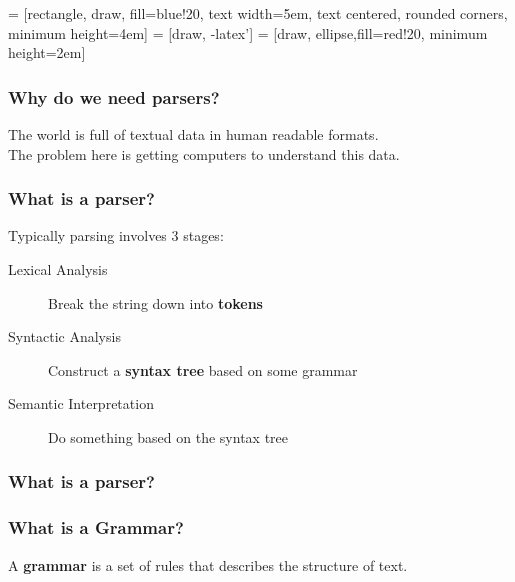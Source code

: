 \documentclass{beamer}
\begin{document}


 = [rectangle, draw, fill=blue!20, 
    text width=5em, text centered, rounded corners, minimum height=4em]
 = [draw, -latex']
 = [draw, ellipse,fill=red!20,
    minimum height=2em]


\begin{frame}
\frametitle{Why do we need parsers?}
The world is full of textual data in human readable formats. \\
\bigskip
The problem here is getting computers to understand this data.
\end{frame}

\begin{frame}
\frametitle{What is a parser?}
Typically parsing involves 3 stages:
\medskip
\begin{description}
\item[Lexical Analysis] Break the string down into \textbf{tokens}

\item[Syntactic Analysis] Construct a \textbf{syntax tree} based on some grammar

\item[Semantic Interpretation] Do something based on the syntax tree
\end{description}

\end{frame}
    

\begin{frame}
\frametitle{What is a parser?}
\begin{center}
\scalebox{0.8}
{
}
\end{center}
\end{frame}

\begin{frame}
\frametitle{What is a Grammar?}

A \textbf{grammar} is a set of rules that describes the structure of text.
\end{frame}
\end{document}
